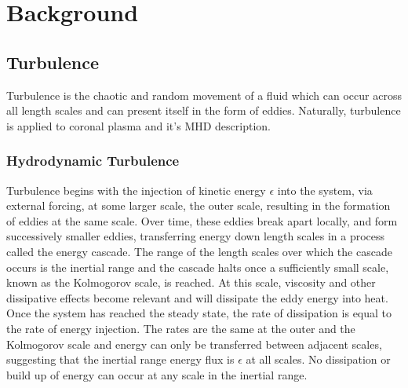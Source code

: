 \chapter{Background}
\label{chap:lit}
\section{Turbulence}
Turbulence is the chaotic and random movement of a fluid which can occur across all length scales and can present itself in the form of eddies. Naturally, turbulence is applied to coronal plasma and it’s MHD description.

\subsection{Hydrodynamic Turbulence}
Turbulence begins with the injection of kinetic energy \(\epsilon\) into the system, via external forcing, at some larger scale, the outer scale, resulting in the formation of eddies at the same scale. Over time, these eddies break apart locally, and form successively smaller eddies, transferring energy down length scales in a process called the energy cascade. The range of the length scales over which the cascade occurs is the inertial range and the cascade halts once a sufficiently small scale, known as the Kolmogorov scale, is reached. At this scale, viscosity and other dissipative effects become relevant and will dissipate the eddy energy into heat. Once the system has reached the steady state, the rate of dissipation is equal to the rate of energy injection. The rates are the same at the outer and the Kolmogorov scale and energy can only be transferred between adjacent scales, suggesting that the inertial range energy flux is \(\epsilon\) at all scales. No dissipation or build up of energy can occur at any scale in the inertial range.

